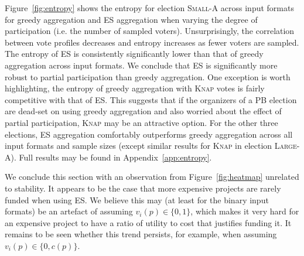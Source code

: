 \documentclass{comsoc2023}
\newcommand{\points}{\textsc{Points}}
\newcommand{\knap}{\textsc{Knap}}
\newcommand{\mes}{ES}
\begin{document}
Figure~\ref{fig:entropy} shows the entropy for election   \textsc{Small-A} across   input formats for greedy aggregation and  \mes{} aggregation when varying the degree of participation (i.e. the number of sampled voters). 
Unsurprisingly, the correlation between vote profiles decreases and entropy increases  as fewer voters are sampled. 
The entropy of \mes{} is consistently significantly lower than that of greedy aggregation across input formats. We conclude that \mes{} is significantly more robust to partial participation than greedy aggregation. One exception is worth highlighting, the entropy of greedy aggregation with \knap{} votes is fairly competitive with that of \mes. This suggests that if the organizers of a PB election are dead-set on using greedy aggregation and also worried about the effect of partial participation,  \knap{} may be an attractive option.  
%
For the other three elections,   \mes{} aggregation comfortably outperforms greedy aggregation across all input formats and sample sizes (except similar results for \knap{} in election \textsc{Large-A}). Full results  may be found in Appendix~\ref{app:entropy}. 



We conclude this section with an observation from  Figure~\ref{fig:heatmap} unrelated to stability. It appears to be the case that more expensive projects are rarely funded  when using \mes{}.  We believe this may (at least for the binary input formats)  be an artefact of assuming $v_i(p)\in \{0,1\}$, which makes it very hard for an expensive project to have a ratio of utility to cost that justifies funding it. It remains to be seen whether this trend persists, for example, when assuming $v_i(p)\in \{0,c(p)\}$.
\end{document}
